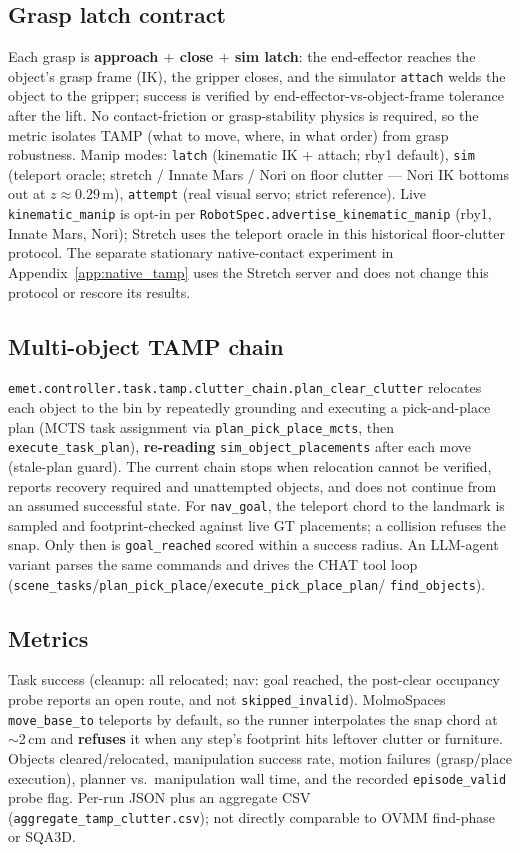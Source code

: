 \subsection{Grasp latch contract}
Each grasp is \textbf{approach $+$ close $+$ sim latch}: the end-effector reaches the
object's grasp frame (IK), the gripper closes, and the simulator \texttt{attach} welds
the object to the gripper; success is verified by end-effector-vs-object-frame tolerance
after the lift. No contact-friction or grasp-stability physics is required, so the metric
isolates TAMP (what to move, where, in what order) from grasp robustness. Manip modes:
\texttt{latch} (kinematic IK + attach; rby1 default), \texttt{sim} (teleport oracle;
stretch / Innate Mars / Nori on floor clutter --- Nori IK bottoms out at
$z\approx 0.29$\,m), \texttt{attempt} (real visual servo; strict reference). Live
\texttt{kinematic\_manip} is opt-in per \texttt{RobotSpec.advertise\_kinematic\_manip}
(rby1, Innate Mars, Nori); Stretch uses the teleport oracle in this historical floor-clutter protocol.
The separate stationary native-contact experiment in Appendix~\ref{app:native_tamp}
uses the Stretch server and does not change this protocol or rescore its results.

\subsection{Multi-object TAMP chain}
\texttt{emet.controller.task.tamp.clutter\_chain.plan\_clear\_clutter} relocates each
object to the bin by repeatedly grounding and executing a pick-and-place plan
(MCTS task assignment via \texttt{plan\_pick\_place\_mcts}, then
\texttt{execute\_task\_plan}), \textbf{re-reading} \texttt{sim\_object\_placements}
after each move (stale-plan guard). The current chain stops when relocation cannot be verified, reports recovery
required and unattempted objects, and does not continue from an assumed successful
state. For \texttt{nav\_goal}, the teleport chord to the landmark is
sampled and footprint-checked against live GT placements; a collision refuses
the snap. Only then is \texttt{goal\_reached} scored within a success radius. An
LLM-agent variant parses the same commands and drives the CHAT tool loop
(\texttt{scene\_tasks}/\texttt{plan\_pick\_place}/\texttt{execute\_pick\_place\_plan}/
\texttt{find\_objects}).

\subsection{Metrics}
Task success (cleanup: all relocated; nav: goal reached, the post-clear
occupancy probe reports an open route, and not \texttt{skipped\_invalid}).
MolmoSpaces \texttt{move\_base\_to} teleports by default, so the runner
interpolates the snap chord at $\sim$2\,cm and \textbf{refuses} it when any
step's footprint hits leftover clutter or furniture. Objects cleared/relocated, manipulation success rate,
motion failures (grasp/place execution), planner vs.\ manipulation wall time, and the
recorded \texttt{episode\_valid} probe flag. Per-run JSON plus an aggregate CSV
(\texttt{aggregate\_tamp\_clutter.csv}); not directly comparable to OVMM find-phase or
SQA3D.

